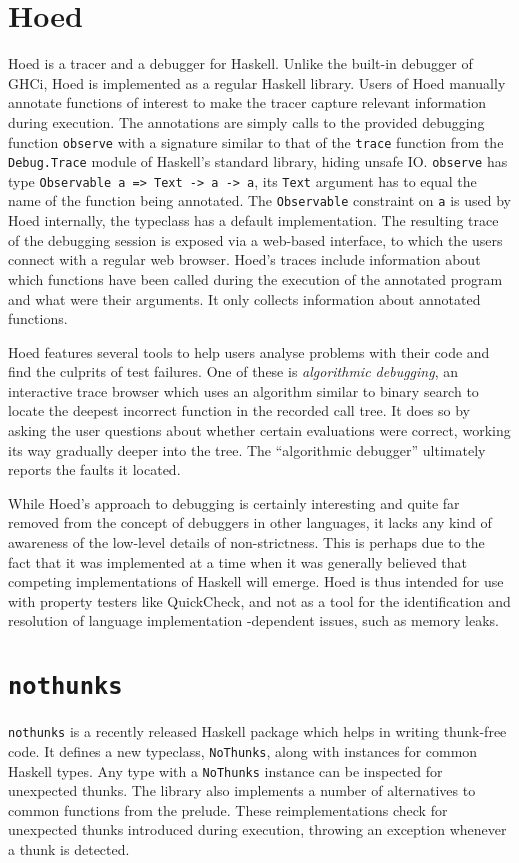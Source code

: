 \documentclass[thesis=B,english]{FITthesis}[2019/12/23]
\begin{document}
\section{Hoed}
Hoed\cite{gh-hoed} is a tracer and a debugger for Haskell. Unlike the built-in
debugger of GHCi, Hoed is implemented as a regular Haskell library. Users of
Hoed manually annotate functions of interest to make the tracer capture
relevant information during execution. The annotations are simply calls to the
provided debugging function \texttt{observe} with a signature similar to that
of the \texttt{trace} function from the \texttt{Debug.Trace} module of
Haskell's standard library, hiding unsafe IO. \texttt{observe} has type
\texttt{Observable a => Text -> a -> a}, its \texttt{Text} argument has to
equal the name of the function being annotated. The \texttt{Observable}
constraint on \texttt{a} is used by Hoed internally, the typeclass has a
default implementation. The resulting trace of the debugging session is exposed
via a web-based interface, to which the users connect with a regular web
browser.  Hoed's traces include information about which functions have been
called during the execution of the annotated program and what were their
arguments. It only collects information about annotated functions.

Hoed features several tools to help users analyse problems with their code and
find the culprits of test failures. One of these is \textit{algorithmic
debugging}, an interactive trace browser which uses an algorithm similar to
binary search to locate the deepest incorrect function in the recorded call
tree. It does so by asking the user questions about whether certain evaluations
were correct, working its way gradually deeper into the tree. The ``algorithmic
debugger'' ultimately reports the faults it located.

While Hoed's approach to debugging is certainly interesting and quite far
removed from the concept of debuggers in other languages, it lacks any kind of
awareness of the low-level details of non-strictness. This is perhaps due to
the fact that it was implemented at a time when it was generally believed that
competing implementations of Haskell will emerge. %
Hoed is thus intended for use with property testers like QuickCheck, %
and not as a tool for the identification and resolution of language
implementation -dependent issues, such as memory leaks.


\section{\texttt{nothunks}}
\texttt{nothunks} is a recently released Haskell package which helps in writing
thunk-free code. It defines a new typeclass, \texttt{NoThunks}, along with
instances for common Haskell types. Any type with a \texttt{NoThunks} instance
can be inspected for unexpected thunks. The library also implements a number of
alternatives to common functions from the prelude. These reimplementations
check for unexpected thunks introduced during execution, throwing an exception
whenever a thunk is detected.
\end{document}
